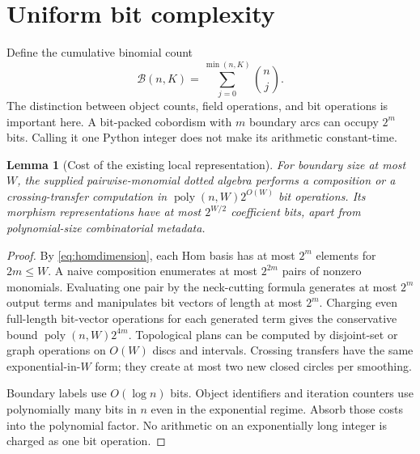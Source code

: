\documentclass[11pt]{article}
\newtheorem{lemma}[theorem]{Lemma}
\theoremstyle{definition}\newtheorem{definition}[theorem]{Definition}
\theoremstyle{remark}\newtheorem{remark}[theorem]{Remark}
\newcommand{\B}{\mathcal B}
\begin{document}
\section{Uniform bit complexity}
\label{sec:complexity}
Define the cumulative binomial count
\begin{equation}
 \B(n,K)=\sum_{j=0}^{\min(n,K)}\binom nj.
 \label{eq:B}
\end{equation}
The distinction between object counts, field operations, and bit operations is important here. A bit-packed cobordism with $m$ boundary arcs can occupy $2^m$ bits. Calling it one Python integer does not make its arithmetic constant-time.

\begin{lemma}[Cost of the existing local representation]\label{lem:localcost}
For boundary size at most $W$, the supplied pairwise-monomial dotted algebra performs a composition or a crossing-transfer computation in $\operatorname{poly}(n,W)2^{O(W)}$ bit operations. Its morphism representations have at most $2^{W/2}$ coefficient bits, apart from polynomial-size combinatorial metadata.
\end{lemma}
\begin{proof}
By \eqref{eq:homdimension}, each Hom basis has at most $2^m$ elements for $2m\leq W$. A naive composition enumerates at most $2^{2m}$ pairs of nonzero monomials. Evaluating one pair by the neck-cutting formula generates at most $2^m$ output terms and manipulates bit vectors of length at most $2^m$. Charging even full-length bit-vector operations for each generated term gives the conservative bound $\operatorname{poly}(n,W)2^{4m}$. Topological plans can be computed by disjoint-set or graph operations on $O(W)$ discs and intervals. Crossing transfers have the same exponential-in-$W$ form; they create at most two new closed circles per smoothing.

Boundary labels use $O(\log n)$ bits. Object identifiers and iteration counters use polynomially many bits in $n$ even in the exponential regime. Absorb those costs into the polynomial factor. No arithmetic on an exponentially long integer is charged as one bit operation.
\end{proof}
\end{document}
